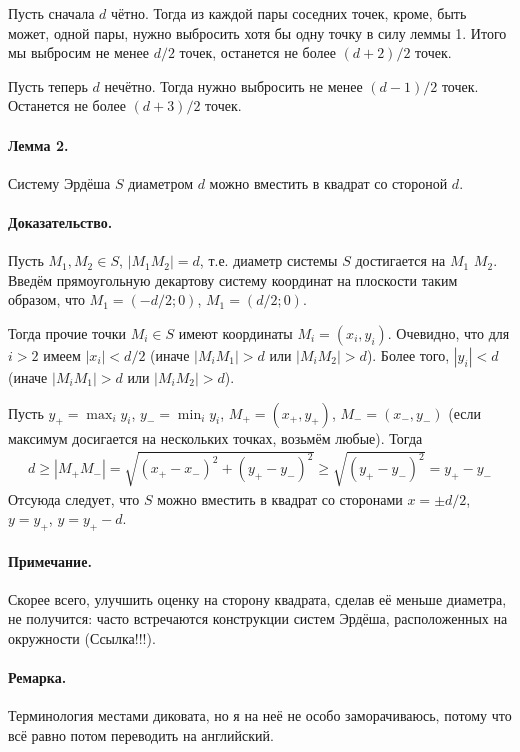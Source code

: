 \documentclass[a4paper,14pt]{article} %
\begin{document}
Пусть сначала $d$ чётно.
Тогда из каждой пары соседних точек, кроме, быть может, одной пары,
нужно выбросить хотя бы одну точку в силу леммы 1.
Итого мы выбросим не менее $d/2$ точек,
останется не более $(d+2)/2$ точек.

Пусть теперь $d$ нечётно.
Тогда нужно выбросить не менее $(d-1)/2$ точек.
Останется не более $(d+3)/2$ точек.

\paragraph{Лемма 2.}
Систему Эрдёша $S$ диаметром $d$ можно вместить в квадрат со стороной $d$.

\paragraph{Доказательство.}
Пусть $M_1, M_2 \in S$, $|M_1 M_2| = d$,
т.е. диаметр системы $S$ достигается на $M_1$  $M_2$.
Введём прямоугольную декартову систему координат на плоскости таким образом, что
$M_1 = (-d/2; 0)$, $M_1 = (d/2; 0)$.

Тогда прочие точки $M_i \in S$ имеют координаты $M_i=(x_i, y_i)$.
Очевидно, что для $i>2$ имеем $|x_i| < d/2$
(иначе $|M_i M_1| > d$ или $|M_i M_2| > d$).
Более того, $|y_i| < d$ (иначе $|M_i M_1| > d$ или $|M_i M_2| > d$).

Пусть $y_+ = \max_{i} y_i$, $y_- = \min_{i} y_i$, $M_+=(x_+, y_+)$, $M_-=(x_-, y_-)$
(если максимум досигается на нескольких точках, возьмём любые).
Тогда
\begin{multline}
	d \geq |M_+ M_-| = \sqrt{(x_+ - x_-)^2 + (y_+ - y_-)^2}
	\geq \sqrt{(y_+ - y_-)^2} = y_+ - y_-
\end{multline}
Отсуюда следует, что $S$ можно вместить в квадрат со сторонами $x=\pm d/2$,
$y=y_+$, $y=y_+ - d$.

\paragraph{Примечание.}
Скорее всего, улучшить оценку на сторону квадрата, сделав её меньше диаметра,
не получится: часто встречаются конструкции систем Эрдёша, расположенных на окружности
(Ссылка!!!).

\paragraph{Ремарка.}
Терминология местами диковата,
но я на неё не особо заморачиваюсь,
потому что всё равно потом переводить на английский.
\end{document}
